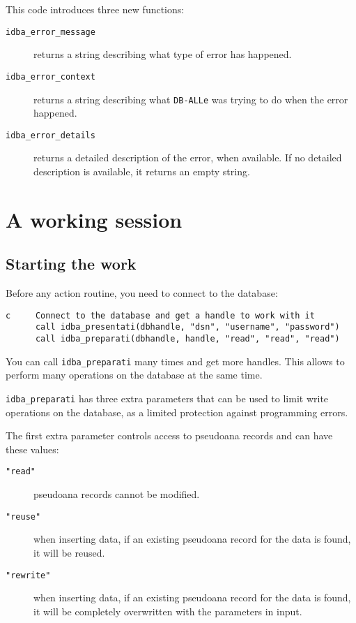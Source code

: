 \documentclass[draft,12pt,a4paper,twoside]{book}
\newcommand{\dballe}{{\tt DB-ALLe}}
\begin{document}
This code introduces three new functions:

\begin{description}
\item[{\tt idba\_error\_message}]
  returns a string describing what type of error has happened.
\item[{\tt idba\_error\_context}]
  returns a string describing what \dballe{} was trying to do when the error
  happened.
\item[{\tt idba\_error\_details}]
  returns a detailed description of the error, when available.  If no detailed
  description is available, it returns an empty string.
\end{description}

\chapter {A working session}
\label{ch-work}

\section{Starting the work}

Before any action routine, you need to connect to the database:

\label{fun-idba_presentati}
\label{fun-idba_preparati}

\begin{verbatim}
c     Connect to the database and get a handle to work with it
      call idba_presentati(dbhandle, "dsn", "username", "password")
      call idba_preparati(dbhandle, handle, "read", "read", "read")
\end{verbatim}

You can call {\tt idba\_preparati} many times and get more handles.  This allows
to perform many operations on the database at the same time.

{\tt idba\_preparati} has three extra parameters that can be used to limit
write operations on the database, as a limited protection against programming
errors.

The first extra parameter controls access to pseudoana records and can have
these values:

\begin{description}
\item[{\tt "read"}] pseudoana records cannot be modified.
\item[{\tt "reuse"}] when inserting data, if an existing pseudoana record for
                     the data is found, it will be reused.
\item[{\tt "rewrite"}] when inserting data, if an existing pseudoana record for
		     the data is found, it will be completely overwritten with
		     the parameters in input.
\end{description}
\end{document}
